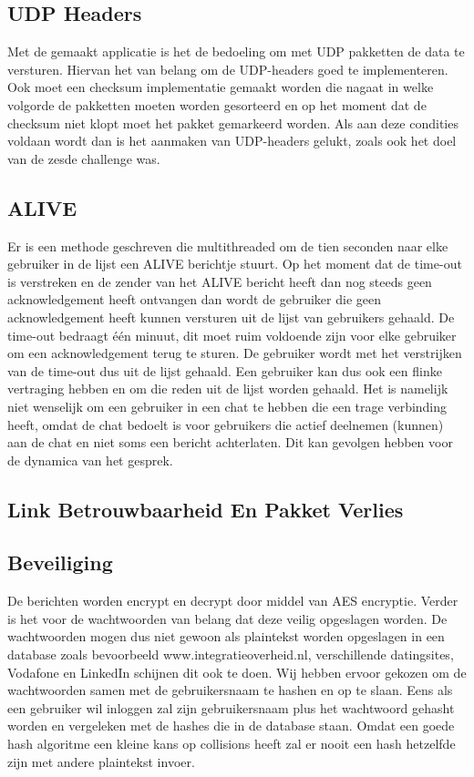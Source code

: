 \documentclass[12pt]{article}
\begin{document}
\subsection{UDP Headers}
Met de gemaakt applicatie is het de bedoeling om met UDP pakketten de data te versturen. Hiervan het van belang om de UDP-headers goed te implementeren. Ook moet een checksum implementatie gemaakt worden die nagaat in welke volgorde de pakketten moeten worden gesorteerd en op het moment dat de checksum niet klopt moet het pakket gemarkeerd worden. Als aan deze condities voldaan wordt dan is het aanmaken van UDP-headers gelukt, zoals ook het doel van de zesde challenge was. 


\subsection{ALIVE}
Er is een methode geschreven die multithreaded om de tien seconden naar elke gebruiker in de lijst een ALIVE berichtje stuurt. Op het moment dat de time-out is verstreken en de zender van het ALIVE bericht heeft dan nog steeds geen acknowledgement heeft ontvangen dan wordt de gebruiker die geen acknowledgement heeft kunnen versturen uit de lijst van gebruikers gehaald. De time-out bedraagt \'e\'en minuut, dit moet ruim voldoende zijn voor elke gebruiker om een acknowledgement terug te sturen. De gebruiker wordt met het verstrijken van de time-out dus uit de lijst gehaald. Een gebruiker kan dus ook een flinke vertraging hebben en om die reden uit de lijst worden gehaald. Het is namelijk niet wenselijk om een gebruiker in een chat te hebben die een trage verbinding heeft, omdat de chat bedoelt is voor gebruikers die actief deelnemen (kunnen) aan de chat en niet soms een bericht achterlaten. Dit kan gevolgen hebben voor de dynamica van het gesprek.

\subsection{Link Betrouwbaarheid En Pakket Verlies}


\subsection{Beveiliging}
De berichten worden encrypt en decrypt door middel van AES encryptie. Verder is het voor de wachtwoorden van belang dat deze veilig opgeslagen worden. De wachtwoorden mogen dus niet gewoon als plaintekst worden opgeslagen in een database zoals bevoorbeeld www.integratieoverheid.nl, verschillende datingsites, Vodafone en LinkedIn schijnen dit ook te doen. Wij hebben ervoor gekozen om de wachtwoorden samen met de gebruikersnaam te hashen en op te slaan. Eens als een gebruiker wil inloggen zal zijn gebruikersnaam plus het wachtwoord gehasht worden en vergeleken met de hashes die in de database staan. Omdat een goede hash algoritme een kleine kans op collisions heeft zal er nooit een hash hetzelfde zijn met andere plaintekst invoer.
\end{document}
